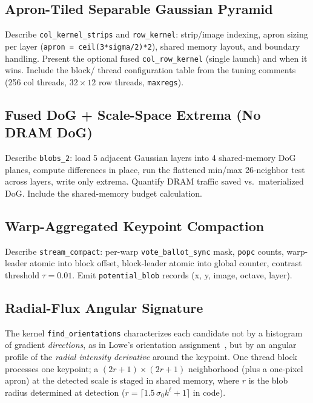 \subsection{Apron-Tiled Separable Gaussian Pyramid}
\label{sec:gauss}
\begin{fillbox}
Describe \texttt{col\_kernel\_strips} and \texttt{row\_kernel}: strip/image
indexing, apron sizing per layer (\texttt{apron = ceil(3*sigma/2)*2}), shared
memory layout, and boundary handling. Present the optional fused
\texttt{col\_row\_kernel} (single launch) and when it wins. Include the block/
thread configuration table from the tuning comments (256 col threads,
$32\times12$ row threads, \texttt{maxregs}).
\end{fillbox}

\subsection{Fused DoG + Scale-Space Extrema (No DRAM DoG)}
\label{sec:fused}
\begin{fillbox}
Describe \texttt{blobs\_2}: load 5 adjacent Gaussian layers into 4 shared-memory
DoG planes, compute differences in place, run the flattened min/max 26-neighbor
test across layers, write only extrema. Quantify DRAM traffic saved vs.\
materialized DoG. Include the shared-memory budget calculation.
\end{fillbox}

\subsection{Warp-Aggregated Keypoint Compaction}
\label{sec:compact}
\begin{fillbox}
Describe \texttt{stream\_compact}: per-warp \texttt{vote\_ballot\_sync} mask,
\texttt{popc} counts, warp-leader atomic into block offset, block-leader atomic
into global counter, contrast threshold $\tau=0.01$. Emit \texttt{potential\_blob}
records (x, y, image, octave, layer).
\end{fillbox}

\subsection{Radial-Flux Angular Signature}
\label{sec:orient}

The kernel \texttt{find\_orientations} characterizes each candidate not by a
histogram of gradient \emph{directions}, as in Lowe's orientation
assignment~\cite{lowe2004}, but by an angular profile of the \emph{radial
intensity derivative} around the keypoint. One thread block processes one
keypoint; a $(2r{+}1)\times(2r{+}1)$ neighborhood (plus a one-pixel apron) at
the detected scale is staged in shared memory, where $r$ is the blob radius
determined at detection ($r=\lceil 1.5\,\sigma_0 k^{\ell}+1\rceil$ in code).

